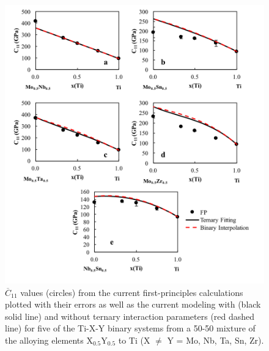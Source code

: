 \pagebreak
\begin{figure}[H]
	\centering
	\includegraphics[width=\textwidth]{Chapter-6/Figures/tixyc111.png}
	\caption{$\overline{C}_{11}$ values (circles) from the current first-principles calculations plotted with their errors as well as the current modeling with (black solid line) and without ternary interaction parameters (red dashed line) for five of the Ti-X-Y binary systems from a 50-50 mixture of the alloying elements X$_{0.5}$Y$_{0.5}$ to Ti (X $\neq$ Y = Mo, Nb, Ta, Sn, Zr).}
	\label{Ch6-figure:tixyc11_1}
\end{figure}

